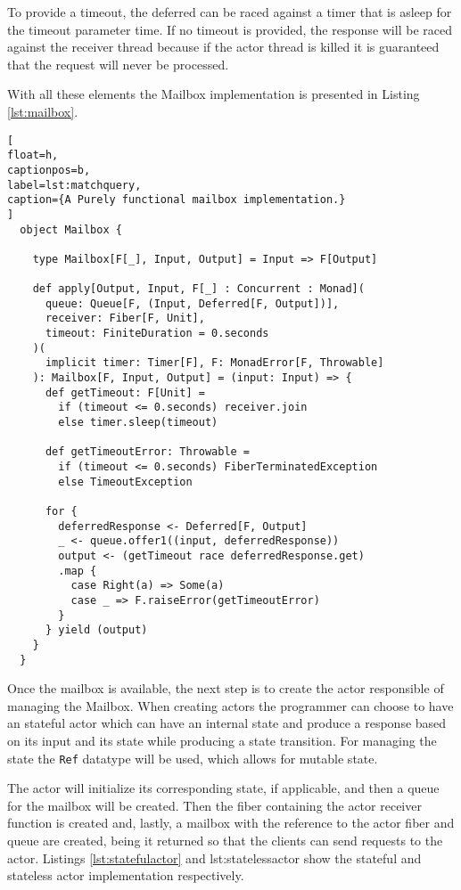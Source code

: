 \documentclass[../main.tex]{subfiles}
\begin{document}
To provide a timeout, the deferred can be raced against a timer that is
asleep for the timeout parameter time. If no timeout is provided, the response
will be raced against the receiver thread because if the actor thread is killed
it is guaranteed that the request will never be processed.

With all these elements the Mailbox implementation is presented in Listing
\ref{lst:mailbox}.


\begin{lstlisting}[
float=h,
captionpos=b,
label=lst:matchquery,
caption={A Purely functional mailbox implementation.}
]
  object Mailbox {

    type Mailbox[F[_], Input, Output] = Input => F[Output]

    def apply[Output, Input, F[_] : Concurrent : Monad](
      queue: Queue[F, (Input, Deferred[F, Output])],
      receiver: Fiber[F, Unit],
      timeout: FiniteDuration = 0.seconds
    )(
      implicit timer: Timer[F], F: MonadError[F, Throwable]
    ): Mailbox[F, Input, Output] = (input: Input) => {
      def getTimeout: F[Unit] =
        if (timeout <= 0.seconds) receiver.join
        else timer.sleep(timeout)

      def getTimeoutError: Throwable =
        if (timeout <= 0.seconds) FiberTerminatedException
        else TimeoutException

      for {
        deferredResponse <- Deferred[F, Output]
        _ <- queue.offer1((input, deferredResponse))
        output <- (getTimeout race deferredResponse.get)
        .map {
          case Right(a) => Some(a)
          case _ => F.raiseError(getTimeoutError)
        }
      } yield (output)
    }
  }
\end{lstlisting}

Once the mailbox is available, the next step is to create the actor responsible
of managing the Mailbox. When creating actors the programmer can choose to have
an stateful actor which can have an internal state and produce a response based
on its input and its state while producing a state transition. For managing the
state the \texttt{Ref} datatype \autocite{Cats-effectCats.effect.concurrent.Ref} will be
used, which allows for mutable state.

The actor will initialize its corresponding state, if applicable, and then a queue
for the mailbox will be created. Then the fiber containing the actor receiver function is
created and, lastly, a mailbox with the reference to the actor fiber and queue are
created, being it returned so that the clients can send requests to the actor.
Listings \ref{lst:statefulactor} and {lst:statelessactor} show the
stateful and stateless actor implementation respectively.
\end{document}
